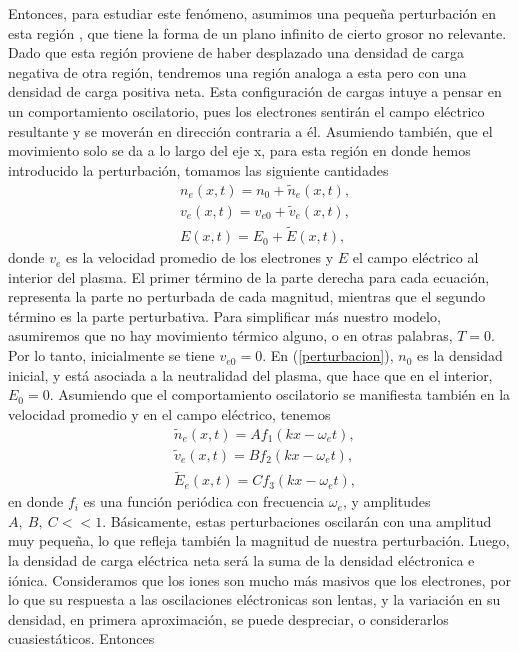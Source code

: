 \documentclass[../main.tex]{subfiles}
\begin{document}
    Entonces, para estudiar este fenómeno, asumimos una pequeña perturbación en esta región \cite{chen1984introduction}, que tiene la forma de un plano infinito de cierto grosor no relevante. Dado que esta región proviene de haber desplazado una densidad de carga negativa de otra región, tendremos una región analoga a esta pero con una densidad de carga positiva neta. Esta configuración de cargas intuye a pensar en un comportamiento oscilatorio, pues los electrones sentirán el campo eléctrico resultante
    y se moverán en dirección contraria a él. Asumiendo también, que el movimiento solo se da a lo largo del eje x, para esta región en donde hemos introducido la perturbación, tomamos las siguiente cantidades
        \begin{align}
            &n_e(x,t) = n_0 + \tilde{n}_e(x,t), \label{perturbacion}\\
            &v_e(x,t) = v_{e0} + \tilde{v}_e(x,t), \\
            &E(x,t) = E_0 + \tilde{E}(x,t),
        \end{align}
    donde $v_e$ es la velocidad promedio de los electrones y $E$ el campo eléctrico al interior del plasma. El primer término de la parte derecha para cada ecuación, representa la parte no perturbada de cada magnitud, mientras que el segundo término es la parte perturbativa. Para simplificar más nuestro modelo, asumiremos que no hay movimiento térmico alguno, o en otras palabras, $T = 0$. Por lo tanto, inicialmente se tiene $v_{e0} =0$. En (\ref{perturbacion}), $n_0$ es la densidad inicial, y está asociada a la neutralidad del plasma, que hace que en el interior, $E_0 = 0$. Asumiendo que el comportamiento oscilatorio se manifiesta también en la velocidad promedio y en el campo eléctrico, tenemos
        \begin{align}
            &\tilde{n}_e(x,t) = Af_1(kx - \omega_et), \\
            &\tilde{v}_e(x,t) = Bf_2(kx - \omega_et), \label{velocidad_perturbada}\\
            &\tilde{E}_e(x,t) = Cf_3(kx - \omega_et), \label{campo_perturbado}
        \end{align}
    en donde $f_i$ es una función periódica con frecuencia $\omega_e$, y amplitudes $A, \ B, \ C << 1$. Básicamente, estas perturbaciones oscilarán con una amplitud muy pequeña, lo que refleja también la magnitud de nuestra perturbación. Luego, la densidad de carga eléctrica neta será la suma de la densidad eléctronica e iónica. Consideramos que los iones son mucho más masivos que los electrones, por lo que su respuesta a las oscilaciones eléctronicas son lentas, y la variación en su densidad, en primera aproximación, se puede despreciar, o considerarlos cuasiestáticos. Entonces
\end{document}
